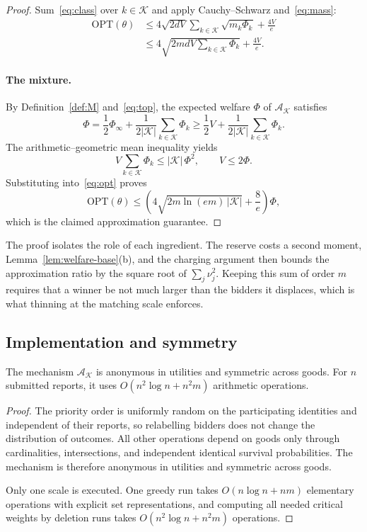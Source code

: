 \documentclass[format=acmsmall, review=false]{acmart}
\newcommand{\OPT}{\mathrm{OPT}}
\begin{document}
\begin{proof}
Sum~\eqref{eq:class} over \(k\in\mathcal K\) and apply
Cauchy--Schwarz and~\eqref{eq:mass}:
\begin{equation}\label{eq:opt}
\begin{aligned}
\OPT(\theta)
&\le
4\sqrt{2dV}\sum_{k\in\mathcal K}\sqrt{m_k\Phi_k}
+\frac{4V}{e}\\
&\le
4\sqrt{2mdV\sum_{k\in\mathcal K}\Phi_k}
+\frac{4V}{e}.
\end{aligned}
\end{equation}

\paragraph{The mixture.}
By Definition~\ref{def:M} and~\eqref{eq:top}, the expected
welfare \(\Phi\) of \(\mathcal A_{\mathcal K}\) satisfies
\[
\Phi
=\frac12\Phi_\infty
+\frac1{2|\mathcal K|}\sum_{k\in\mathcal K}\Phi_k
\ge\frac12V
+\frac1{2|\mathcal K|}\sum_{k\in\mathcal K}\Phi_k.
\]
The arithmetic--geometric mean inequality yields
\[
V\sum_{k\in\mathcal K}\Phi_k\le|\mathcal K|\,\Phi^2,
\qquad
V\le2\Phi.
\]
Substituting into~\eqref{eq:opt} proves
\[
\OPT(\theta)
\le
\left(
4\sqrt{2m\ln(em)\,|\mathcal K|}+\frac8e
\right)\Phi,
\]
which is the claimed approximation guarantee.
\end{proof}

The proof isolates the role of each ingredient. The reserve
costs a second moment, Lemma~\ref{lem:welfare-base}(b), and the
charging argument then bounds the approximation ratio by the
square root of \(\sum_j\nu_j^2\). Keeping this sum of order \(m\)
requires that a winner be not much larger than the bidders it
displaces, which is what thinning at the matching scale
enforces.

\subsection{Implementation and symmetry}
\label{sec:rand-implementation}

\begin{proposition}\label{prop:implementation}
The mechanism \(\mathcal A_{\mathcal K}\) is anonymous in
utilities and symmetric across goods. For \(n\) submitted
reports, it uses \(O(n^2\log n+n^2m)\) arithmetic operations.
\end{proposition}

\begin{proof}
The priority order is uniformly random on the participating
identities and independent of their reports, so relabelling
bidders does not change the distribution of outcomes. All other
operations depend on goods only through cardinalities,
intersections, and independent identical survival
probabilities. The mechanism is therefore anonymous in utilities
and symmetric across goods.

Only one scale is executed. One greedy run takes
\(O(n\log n+nm)\) elementary operations with explicit set
representations, and computing all needed critical weights by
deletion runs takes \(O(n^2\log n+n^2m)\) operations.
\end{proof}
\end{document}
